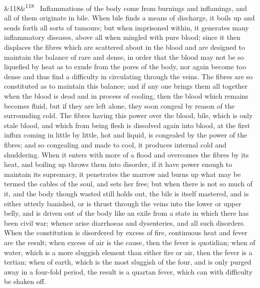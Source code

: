 \documentclass[12pt]{article}
\newcommand{\para}[1][]{\par\noindent\ifx&#1&\else\textsuperscript{\footnotesize #1}~\fi}
\begin{document}
\para[118] Inflammations of the body come from burnings and inflamings, and all of them originate in bile. When bile finds a means of discharge, it boils up and sends forth all sorts of tumours; but when imprisoned within, it generates many inflammatory diseases, above all when mingled with pure blood; since it then displaces the fibres which are scattered about in the blood and are designed to maintain the balance of rare and dense, in order that the blood may not be so liquefied by heat as to exude from the pores of the body, nor again become too dense and thus find a difficulty in circulating through the veins. The fibres are so constituted as to maintain this balance; and if any one brings them all together when the blood is dead and in process of cooling, then the blood which remains becomes fluid, but if they are left alone, they soon congeal by reason of the surrounding cold. The fibres having this power over the blood, bile, which is only stale blood, and which from being flesh is dissolved again into blood, at the first influx coming in little by little, hot and liquid, is congealed by the power of the fibres; and so congealing and made to cool, it produces internal cold and shuddering. When it enters with more of a flood and overcomes the fibres by its heat, and boiling up throws them into disorder, if it have power enough to maintain its supremacy, it penetrates the marrow and burns up what may be termed the cables of the soul, and sets her free; but when there is not so much of it, and the body though wasted still holds out, the bile is itself mastered, and is either utterly banished, or is thrust through the veins into the lower or upper belly, and is driven out of the body like an exile from a state in which there has been civil war; whence arise diarrhoeas and dysenteries, and all such disorders. When the constitution is disordered by excess of fire, continuous heat and fever are the result; when excess of air is the cause, then the fever is quotidian; when of water, which is a more sluggish element than either fire or air, then the fever is a tertian; when of earth, which is the most sluggish of the four, and is only purged away in a four-fold period, the result is a quartan fever, which can with difficulty be shaken off.
\end{document}
